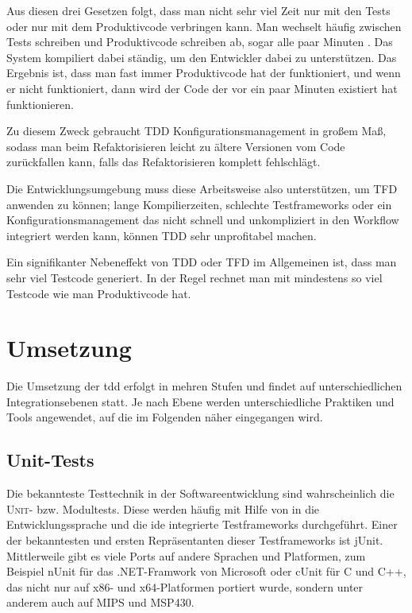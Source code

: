 \documentclass[a4paper,10pt]{scrartcl}
\newcommand{\pje}{\marginpar{Philipp\\Jeske}}
\begin{document}
Aus diesen drei Gesetzen folgt, dass man nicht sehr viel Zeit nur mit den Tests
oder nur mit dem Produktivcode verbringen kann. Man wechselt häufig zwischen
Tests schreiben und Produktivcode schreiben ab, sogar alle paar Minuten
\cite{itAgile, UncleBob}. Das System kompiliert dabei ständig, um den
Entwickler dabei zu unterstützen. Das Ergebnis ist, dass man fast immer
Produktivcode hat der funktioniert, und wenn er nicht funktioniert, dann wird
der Code der vor ein paar Minuten existiert hat funktionieren.

Zu diesem Zweck gebraucht TDD Konfigurationsmanagement in großem Maß, sodass
man beim Refaktorisieren leicht zu ältere Versionen vom Code zurückfallen kann,
falls das Refaktorisieren komplett fehlschlägt.

Die Entwicklungsumgebung muss diese Arbeitsweise also unterstützen, um TFD
anwenden zu können; lange Kompilierzeiten, schlechte Testframeworks oder ein
Konfigurationsmanagement das nicht schnell und unkompliziert in den Workflow
integriert werden kann, können TDD sehr unprofitabel machen.

Ein signifikanter Nebeneffekt von TDD oder TFD im Allgemeinen ist, dass man
sehr viel Testcode generiert. In der Regel rechnet man mit mindestens so viel
Testcode wie man Produktivcode hat. \cite{SQlite3, C2}

\section{Umsetzung}\label{Umsetzung}\pje
Die Umsetzung der \gls{tdd} erfolgt in mehren Stufen und findet auf
unterschiedlichen Integrationsebenen statt. Je nach Ebene werden
unterschiedliche Praktiken und Tools angewendet, auf die im Folgenden näher
eingegangen wird.

\subsection{Unit-Tests}
Die bekannteste Testtechnik in der Softwareentwicklung sind wahrscheinlich die
\textsc{Unit}- bzw. Modultests. Diese werden häufig mit Hilfe von in die
Entwicklungssprache und die \gls{ide} integrierte Testframeworks durchgeführt.
Einer der bekanntesten und ersten Repräsentanten dieser Testframeworks ist
jUnit. Mittlerweile gibt es viele Ports auf andere Sprachen und Platformen, zum
Beispiel nUnit für das .NET-Framwork von Microsoft oder cUnit für C und C++,
das nicht nur auf x86- und x64-Platformen portiert wurde, sondern unter anderem
auch auf MIPS und MSP430.
\end{document}
